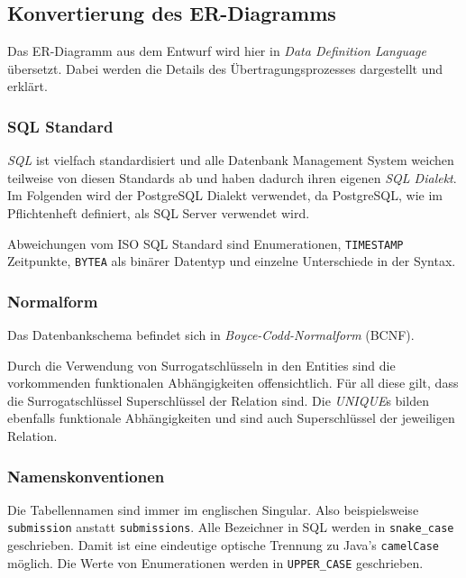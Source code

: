 
\subsection{Konvertierung des ER-Diagramms}

Das ER-Diagramm aus dem Entwurf wird hier in \emph{Data Definition Language} übersetzt. Dabei werden die Details des Übertragungsprozesses dargestellt und erklärt.

\subsubsection{SQL Standard}

\emph{SQL} ist vielfach standardisiert und alle Datenbank Management System weichen teilweise von diesen Standards ab und haben dadurch ihren eigenen \emph{SQL Dialekt}. Im Folgenden wird der PostgreSQL Dialekt verwendet, da PostgreSQL, wie im Pflichtenheft definiert, als SQL Server verwendet wird.

Abweichungen vom ISO SQL Standard sind Enumerationen, \texttt{TIMESTAMP} Zeitpunkte, \texttt{BYTEA} als binärer Datentyp und einzelne Unterschiede in der Syntax.

\subsubsection{Normalform}

Das Datenbankschema befindet sich in \emph{Boyce-Codd-Normalform} (BCNF).

Durch die Verwendung von Surrogatschlüsseln in den Entities sind die vorkommenden funktionalen Abhängigkeiten offensichtlich. Für all diese gilt, dass die Surrogatschlüssel Superschlüssel der Relation sind. Die \emph{UNIQUE}s bilden ebenfalls funktionale Abhängigkeiten und sind auch Superschlüssel der jeweiligen Relation.

\subsubsection{Namenskonventionen}

Die Tabellennamen sind immer im englischen Singular. Also beispielsweise \texttt{submission} anstatt \texttt{submissions}.
Alle Bezeichner in SQL werden in \texttt{snake\_case} geschrieben. Damit ist eine eindeutige optische Trennung zu Java's \texttt{camelCase} möglich. Die Werte von Enumerationen werden in \texttt{UPPER\_CASE} geschrieben.

